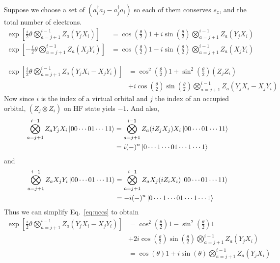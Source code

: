 \documentclass[11pt, oneside]{article}   	%
\begin{document}
Suppose we choose a set of $(a^{\dagger}_i a_j - a^{\dagger}_j a_i)$ so each of them conserves $s_z$, and the total number of electrons.
\begin{align}
\exp \left[ \frac{i}{2} \theta \bigotimes^{i-1}_{a=j+1} Z_a  (Y_j X_i) \right] 
&= \cos \left( \frac{\theta}{2} \right) 1 + i \sin \left( \frac{\theta}{2} \right) \bigotimes^{i-1}_{a=j+1} Z_a  (Y_j X_i) \\
\exp \left[ - \frac{i}{2} \theta \bigotimes^{i-1}_{a=j+1} Z_a  (X_j Y_i) \right]
&= \cos \left( \frac{\theta}{2} \right) 1 - i \sin \left( \frac{\theta}{2} \right) \bigotimes^{i-1}_{a=j+1} Z_a  (X_j Y_i)
\end{align}

\begin{align}
\label{eq:uccs}
\exp \left[ \frac{i}{2} \theta \bigotimes^{i-1}_{a=j+1} Z_a  (Y_j X_i - X_j Y_i) \right] 
&= \cos^2 \left( \frac{\theta}{2} \right) 1 +  \sin^2 \left( \frac{\theta}{2} \right) (Z_j Z_i) \\
&+ i \cos  \left( \frac{\theta}{2} \right) \sin \left( \frac{\theta}{2} \right) \bigotimes^{i-1}_{a=j+1} Z_a  (Y_j X_i - X_j Y_i) 
\end{align}
Now since $i$ is the index of a virtual orbital and $j$ the index of an occupied orbital, $(Z_j \otimes Z_i)$ on HF state yiels $-1$.
And also,
\begin{align}
\bigotimes^{i-1}_{a=j+1} Z_a Y_j X_i \ket{00\cdots01\cdots11} 
&= \bigotimes^{i-1}_{a=j+1} Z_a (i Z_j X_j) X_i \ket{00\cdots01\cdots11} \\
&= i (-)^{n} \ket{0\cdots 1 \cdots01\cdots1 \cdots 1}
\end{align}
and 
\begin{align}
\bigotimes^{i-1}_{a=j+1} Z_a X_j Y_i \ket{00\cdots01\cdots11} 
&= \bigotimes^{i-1}_{a=j+1} Z_a X_j (i Z_i X_i) \ket{00\cdots01\cdots11} \\
&= - i (-)^{n} \ket{0\cdots 1 \cdots01\cdots1 \cdots 1}
\end{align}
Thus we can simplify Eq.~\ref{eq:uccs} to obtain
\begin{align}
\exp \left[ \frac{i}{2} \theta \bigotimes^{i-1}_{a=j+1} Z_a  (Y_j X_i - X_j Y_i) \right] 
&= \cos^2 \left( \frac{\theta}{2} \right) 1 -  \sin^2 \left( \frac{\theta}{2} \right) 1 \\
&+ 2 i \cos  \left( \frac{\theta}{2} \right) \sin \left( \frac{\theta}{2} \right) \bigotimes^{i-1}_{a=j+1} Z_a  (Y_j X_i) \\
&= \cos (\theta) 1 + i \sin (\theta) \bigotimes^{i-1}_{a=j+1} Z_a  (Y_j X_i) 
\end{align}
\end{document}
